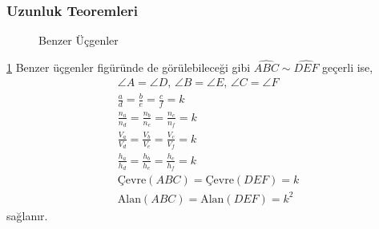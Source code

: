 \subsubsection{Uzunluk Teoremleri}
\begin{figure}[h!]
    \centering
    \caption{Benzer Üçgenler}
    \label{fig:simsegment}
\end{figure}

\ref{fig:simsegment} Benzer üçgenler figüründe de görülebileceği gibi $\widehat{ABC} \sim \widehat{DEF}$ geçerli ise, 
\begin{equation*}
    \begin{aligned}    
        \angle A = \angle D\text{, } \angle B = \angle E \text{, } \angle C = \angle F \\
        \frac{a}{d} = \frac{b}{e} = \frac{c}{f} = k \\
        \frac{n_a}{n_d} = \frac{n_b}{n_e} = \frac{n_c}{n_f} = k \\
        \frac{V_a}{V_d} = \frac{V_b}{V_e} = \frac{V_c}{V_f} = k \\
        \frac{h_a}{h_d} = \frac{h_b}{h_e} = \frac{h_c}{h_f} = k \\
        \text{Çevre}(ABC) = \text{Çevre}(DEF) = k \\
        \text{Alan}(ABC) = \text{Alan}(DEF) = k^2
    \end{aligned}
\end{equation*}
sağlanır.